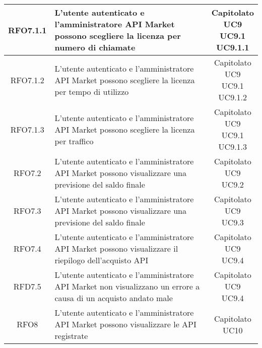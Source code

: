 \begin{longtable}{|c|p{8cm}|c|}
\hypertarget{RFO7.1.1}{RFO7.1.1} &  L'utente autenticato e l'amministratore API Market possono scegliere la licenza per numero di chiamate & \makecell*{Capitolato\\UC9\\UC9.1\\UC9.1.1} \\
\hline

\hypertarget{RFO7.1.2}{RFO7.1.2} &  L'utente autenticato e l'amministratore API Market possono scegliere la licenza per tempo di utilizzo & \makecell*{Capitolato\\UC9\\UC9.1\\UC9.1.2} \\
\hline

\hypertarget{RFO7.1.3}{RFO7.1.3} &  L'utente autenticato e l'amministratore API Market possono scegliere la licenza per traffico & \makecell*{Capitolato\\UC9\\UC9.1\\UC9.1.3} \\
\hline

\hypertarget{RFO7.2}{RFO7.2} &  L'utente autenticato e l'amministratore API Market possono visualizzare una previsione del saldo finale & \makecell*{Capitolato\\UC9\\UC9.2} \\
\hline

\hypertarget{RFO7.3}{RFO7.3} & L'utente autenticato e l'amministratore API Market possono visualizzare una previsione del saldo finale & \makecell*{Capitolato\\UC9\\UC9.3} \\
\hline

\hypertarget{RFO7.4}{RFO7.4} &  L'utente autenticato e l'amministratore API Market possono visualizzare il riepilogo dell'acquisto API & \makecell*{Capitolato\\UC9\\UC9.4} \\
\hline

\hypertarget{RFD7.5}{RFD7.5} &  L'utente autenticato e l'amministratore API Market non visualizzano un errore a causa di un acquisto andato male & \makecell*{Capitolato\\UC9\\UC9.4} \\
\hline

\hypertarget{RFO8}{RFO8} &  L'utente autenticato e l'amministratore API Market possono visualizzare le API registrate & \makecell*{Capitolato\\UC10} \\
\hline


\end{longtable}
